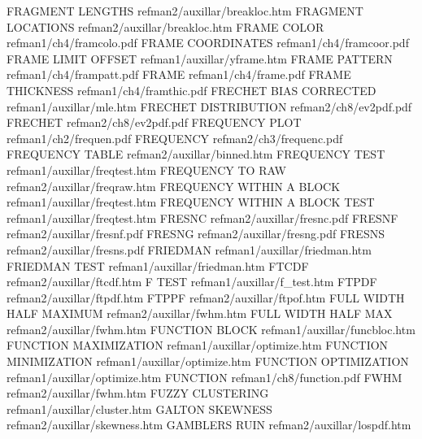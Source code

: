 FRAGMENT LENGTHS                        refman2/auxillar/breakloc.htm
FRAGMENT LOCATIONS                      refman2/auxillar/breakloc.htm
FRAME COLOR                             refman1/ch4/framcolo.pdf
FRAME COORDINATES                       refman1/ch4/framcoor.pdf
FRAME LIMIT OFFSET                      refman1/auxillar/yframe.htm
FRAME PATTERN                           refman1/ch4/frampatt.pdf
FRAME                                   refman1/ch4/frame.pdf
FRAME THICKNESS                         refman1/ch4/framthic.pdf
FRECHET BIAS CORRECTED                  refman1/auxillar/mle.htm
FRECHET DISTRIBUTION                    refman2/ch8/ev2pdf.pdf
FRECHET                                 refman2/ch8/ev2pdf.pdf
FREQUENCY PLOT                          refman1/ch2/frequen.pdf
FREQUENCY                               refman2/ch3/frequenc.pdf
FREQUENCY TABLE                         refman2/auxillar/binned.htm
FREQUENCY TEST                          refman1/auxillar/freqtest.htm
FREQUENCY TO RAW                        refman2/auxillar/freqraw.htm
FREQUENCY WITHIN A BLOCK                refman1/auxillar/freqtest.htm
FREQUENCY WITHIN A BLOCK TEST           refman1/auxillar/freqtest.htm
FRESNC                                  refman2/auxillar/fresnc.pdf
FRESNF                                  refman2/auxillar/fresnf.pdf
FRESNG                                  refman2/auxillar/fresng.pdf
FRESNS                                  refman2/auxillar/fresns.pdf
FRIEDMAN                                refman1/auxillar/friedman.htm
FRIEDMAN TEST                           refman1/auxillar/friedman.htm
FTCDF                                   refman2/auxillar/ftcdf.htm
F TEST                                  refman1/auxillar/f_test.htm
FTPDF                                   refman2/auxillar/ftpdf.htm
FTPPF                                   refman2/auxillar/ftpof.htm
FULL WIDTH HALF MAXIMUM                 refman2/auxillar/fwhm.htm
FULL WIDTH HALF MAX                     refman2/auxillar/fwhm.htm
FUNCTION BLOCK                          refman1/auxillar/funcbloc.htm
FUNCTION MAXIMIZATION                   refman1/auxillar/optimize.htm
FUNCTION MINIMIZATION                   refman1/auxillar/optimize.htm
FUNCTION OPTIMIZATION                   refman1/auxillar/optimize.htm
FUNCTION                                refman1/ch8/function.pdf
FWHM                                    refman2/auxillar/fwhm.htm
FUZZY CLUSTERING                        refman1/auxillar/cluster.htm
GALTON SKEWNESS                         refman2/auxillar/skewness.htm
GAMBLERS RUIN                           refman2/auxillar/lospdf.htm
